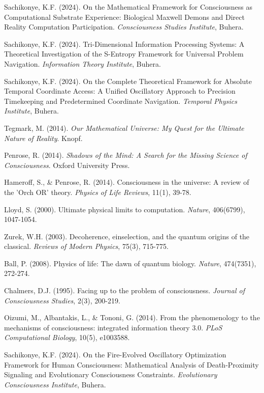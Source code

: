 \documentclass[12pt,a4paper]{article}
\theoremstyle{remark}
\begin{document}
\begin{thebibliography}{99}
Sachikonye, K.F. (2024). On the Mathematical Framework for Consciousness as Computational Substrate Experience: Biological Maxwell Demons and Direct Reality Computation Participation. \textit{Consciousness Studies Institute}, Buhera.

Sachikonye, K.F. (2024). Tri-Dimensional Information Processing Systems: A Theoretical Investigation of the S-Entropy Framework for Universal Problem Navigation. \textit{Information Theory Institute}, Buhera.

Sachikonye, K.F. (2024). On the Complete Theoretical Framework for Absolute Temporal Coordinate Access: A Unified Oscillatory Approach to Precision Timekeeping and Predetermined Coordinate Navigation. \textit{Temporal Physics Institute}, Buhera.

Tegmark, M. (2014). \textit{Our Mathematical Universe: My Quest for the Ultimate Nature of Reality}. Knopf.

Penrose, R. (2014). \textit{Shadows of the Mind: A Search for the Missing Science of Consciousness}. Oxford University Press.

Hameroff, S., \& Penrose, R. (2014). Consciousness in the universe: A review of the 'Orch OR' theory. \textit{Physics of Life Reviews}, 11(1), 39-78.

Lloyd, S. (2000). Ultimate physical limits to computation. \textit{Nature}, 406(6799), 1047-1054.

Zurek, W.H. (2003). Decoherence, einselection, and the quantum origins of the classical. \textit{Reviews of Modern Physics}, 75(3), 715-775.

Ball, P. (2008). Physics of life: The dawn of quantum biology. \textit{Nature}, 474(7351), 272-274.

Chalmers, D.J. (1995). Facing up to the problem of consciousness. \textit{Journal of Consciousness Studies}, 2(3), 200-219.

Oizumi, M., Albantakis, L., \& Tononi, G. (2014). From the phenomenology to the mechanisms of consciousness: integrated information theory 3.0. \textit{PLoS Computational Biology}, 10(5), e1003588.

Sachikonye, K.F. (2024). On the Fire-Evolved Oscillatory Optimization Framework for Human Consciousness: Mathematical Analysis of Death-Proximity Signaling and Evolutionary Consciousness Constraints. \textit{Evolutionary Consciousness Institute}, Buhera.


\end{thebibliography}
\end{document}
